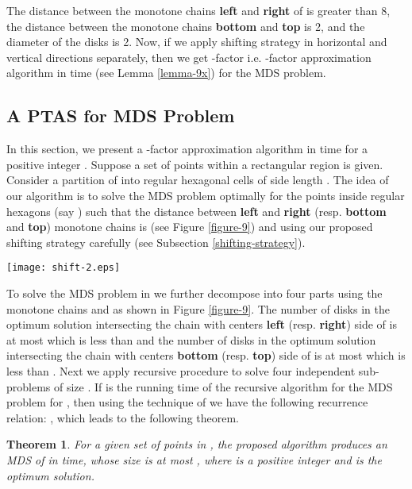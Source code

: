 \documentclass[a4paper,11pt]{article}
\newtheorem{theorem}{Theorem}
\newenvironment{proof}{\noindent {\bf Proof:\,\ }}{\hfill\mbox{\
}\smallskip}
\begin{document}
\begin{proof}
The distance between the monotone chains {\bf left} and {\bf right} of  is greater than 8,  
the distance between the monotone chains {\bf bottom} and {\bf top} is 2, and the diameter  of the 
disks is 2. Now, if we apply shifting 
strategy in horizontal and vertical directions separately, then we get -factor 
i.e. -factor approximation algorithm in  time (see Lemma \ref{lemma-9x}) 
for the MDS problem. 
\end{proof}

\subsection{A PTAS for MDS Problem}
In this section, we present a -factor approximation algorithm in  time for 
a positive integer . Suppose a set  of  points within a rectangular region  is given. 
Consider a partition of  into regular hexagonal cells of side length . The idea 
of our algorithm is to solve the MDS problem optimally for the points inside regular hexagons (say ) 
such that the distance between {\bf left} and {\bf right} (resp. {\bf bottom} and {\bf top}) monotone chains 
is  (see Figure \ref{figure-9}) and using our proposed shifting strategy carefully 
(see Subsection \ref{shifting-strategy}). 

\begin{figure*}[!ht]
\begin{center}
\texttt{[image: shift-2.eps]}
\end{center} 
\caption{Demonstration of PTAS}
\label{figure-9}
\end{figure*}

To solve the MDS problem in  we further decompose  into four parts using 
the monotone chains  and  as shown in Figure \ref{figure-9}. The number of disks in the 
optimum solution intersecting the chain  with centers {\bf left} (resp. {\bf right}) side of 
 is at most  which is less than  and the 
number of disks in the optimum solution intersecting the chain  with centers {\bf bottom} 
(resp. {\bf top}) side of  is at most  which 
is less than . Next we apply recursive procedure to solve four independent sub-problems of 
size . If  is the running time of the recursive algorithm for the MDS problem 
for , then using the technique of \cite{DDCN13} we have the following recurrence 
relation: , which leads to the following theorem. 

\begin{theorem}\label{theorem-4y}
 For a given set  of  points in , the proposed algorithm produces an MDS of  
  in  time, whose size is at most , where  is a 
 positive integer and  is the optimum solution. 
\end{theorem}
\end{document}
